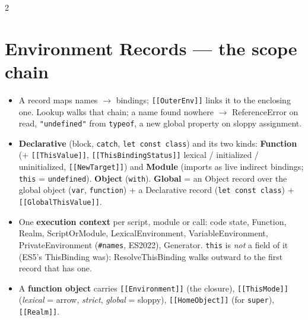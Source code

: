 \documentclass[8pt]{extarticle}
\newcommand\ct[1]{\texttt{#1}}
\begin{document}
\begin{multicols}{2}
\raggedright
\footnotesize{}

\section{Environment Records — the scope chain}
\begin{itemize}
  \item A record maps names $\rightarrow$ bindings; \ct{[[OuterEnv]]} links it to the enclosing
        one. Lookup walks that chain; a name found nowhere $\rightarrow$ ReferenceError on read,
        \ct{"undefined"} from \ct{typeof}, a new global property on sloppy assignment.
  \item \textbf{Declarative} (block, \ct{catch}, \ct{let const class}) and its two kinds:
        \textbf{Function} (+ \ct{[[ThisValue]]}, \ct{[[ThisBindingStatus]]} lexical / initialized /
        uninitialized, \ct{[[NewTarget]]}) and \textbf{Module} (imports as live indirect
        bindings; \ct{this} = \ct{undefined}). \textbf{Object} (\ct{with}). \textbf{Global} = an Object
        record over the global object (\ct{var}, \ct{function}) + a Declarative record
        (\ct{let const class}) + \ct{[[GlobalThisValue]]}.
  \item One \textbf{execution context} per script, module or call: code state, Function, Realm,
        ScriptOrModule, LexicalEnvironment, VariableEnvironment, PrivateEnvironment
        (\ct{\#names}, ES2022), Generator. \ct{this} is \emph{not} a field of it (ES5's
        ThisBinding was): ResolveThisBinding walks outward to the first record that has one.
  \item A \textbf{function object} carries \ct{[[Environment]]} (the closure), \ct{[[ThisMode]]}
        (\emph{lexical} = arrow, \emph{strict}, \emph{global} = sloppy), \ct{[[HomeObject]]} (for
        \ct{super}), \ct{[[Realm]]}.
\end{itemize}


\end{multicols}
\end{document}
